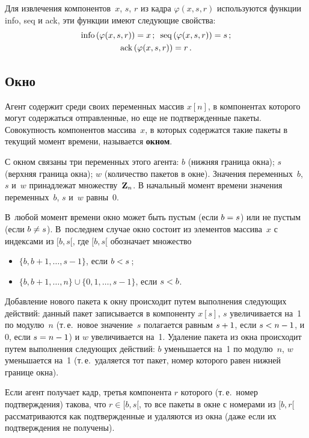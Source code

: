 \begin{multicols}{2}
Для извлечения компонентов~$x$, $s$, $r$
из кадра $\varphi(x, s, r)$ используются функции
info, seq и ack, эти функции имеют следующие свойства:
\begin{gather*}
\mathrm{info}\left(\varphi(x, s, r)\right) = x\,;
\enskip
\mathrm{seq}\left(\varphi(x, s, r)\right) = s\,;\\
\mathrm{ack}\left(\varphi(x, s, r)\right) = r\,.
 \end{gather*}

\vspace*{-12pt}

\subsection{Окно}

Агент
содержит среди своих переменных массив $x[n]$, в компонентах которого могут содержаться отправленные,
но еще не подтвержденные пакеты. Совокупность компонентов массива~$x$,
в которых содержатся такие пакеты в текущий момент времени,
называется {\bf окном}.

С окном связаны три переменных этого агента:
$b$ (нижняя граница окна);
$s$ (верхняя граница окна);
$w$ (количество пакетов в окне).
Значения переменных~$b$, $s$ и~$w$ принадлежат множеству~${\bf Z}_n$.
В начальный момент времени значения переменных~$b$, $s$ и~$w$ равны~0.

 В~любой момент времени окно может быть пус\-тым  (если  $b \hm= s$) или не пустым
(если $b \hm\neq s$).
В~последнем случае окно состоит из элементов массива~$x$
с индексами из  $[b, s[$, где  $[b, s[$
обозначает множество
\begin{itemize}
\item $\{b, b + 1, \ldots, s-1\}$, если $b \hm< s$\,;
\item $\{b, b + 1, \ldots, n\} \cup \{0, 1, \ldots, s -1\}$,
   если $s \hm< b$.
\end{itemize}

Добавление нового пакета к окну происходит путем выполнения
следующих действий: данный пакет записывается в компоненту $x[s]$,
$s$ увеличивается на~1 по модулю~$n$ (т.\,е.\ новое значение~$s$
полагается равным $s\hm+1$, если $s\hm < n\hm-1$, и 0, если $s\hm = n-1$) и  $w$
увеличивается на~1. Удаление пакета из окна происходит путем
выполнения следующих действий: $b$ уменьшается на~1 по модулю~$n$,
$w$ уменьшается на~1 (т.\,е.\ удаляется тот пакет, номер которого
равен нижней границе окна).

Если агент получает кадр, третья компонента $r$ которого  (т.\,е.\
номер подтверждения) такова, что $r \in [b, s[$, то все пакеты в
окне с номерами из $[b, r[$ рассматриваются как подтвержденные и
удаляются из окна (даже если их подтверждения не получены).


\end{multicols}
